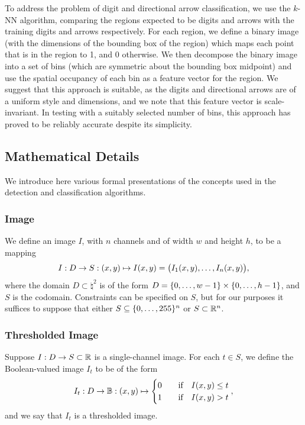 \documentclass{article}
\begin{document}
To address the problem of digit and directional arrow classification, we use
the $k$-NN algorithm, comparing the regions expected to be digits and arrows
with the training digits and arrows respectively.
For each region, we define a binary image (with the dimensions of the bounding
box of the region) which maps each point that is in the region to 1, and 0
otherwise.
We then decompose the binary image into a set of bins (which are symmetric about
the bounding box midpoint) and use the spatial occupancy of each bin as a
feature vector for the region.
We suggest that this approach is suitable, as the digits and directional arrows
are of a uniform style and dimensions, and we note that this feature vector is
scale-invariant.
In testing with a suitably selected number of bins, this approach has proved to
be reliably accurate despite its simplicity.

\subsection{Mathematical Details}
\label{sec:mathematical-details}

We introduce here various formal presentations of the concepts used in the
detection and classification algorithms.

\subsubsection*{Image}

We define an image $I$, with $n$ channels and of width $w$ and height $h$, to be
a mapping
\begin{equation}
  \label{eq:def-image}
  I
  :
  D \to S
  :
  \lr{x, y}
  \mapsto
  I\lr{x, y}
  =
  \lr[\big]
  {
    I_{1}\lr{x, y}
    ,
    \dotsc
    ,
    I_{n}\lr{x, y}
  }
  ,
\end{equation}
where the domain $D \subset \natural^{2}$ is of the form
$D = \lbrace0, \dotsc, w - 1\rbrace \times \lbrace0, \dotsc, h - 1\rbrace$, and $S$ is the
codomain.
Constraints can be specified on $S$, but for our purposes it suffices to suppose
that either $S \subseteq \lbrace0, \dotsc, 255\rbrace^{n}$ or $S \subset \mathbb{R}^{n}$.

\subsubsection*{Thresholded Image}

Suppose $I : D \to S \subset \mathbb{R}$ is a single-channel image.
For each $t \in S$, we define the Boolean-valued image $I_{t}$ to be of the
form
\begin{equation}
  \label{eq:def-image-threshold}
  I_{t}
  :
  D \to \mathbb{B}
  :
  \lr{x, y}
  \mapsto
  \begin{cases}
    0
    &\qq{if}
    I\lr{x, y} \leq t
    \\
    1
    &\qq{if}
    I\lr{x, y} > t
  \end{cases}
  ,
\end{equation}
and we say that $I_{t}$ is a thresholded image.
\end{document}
